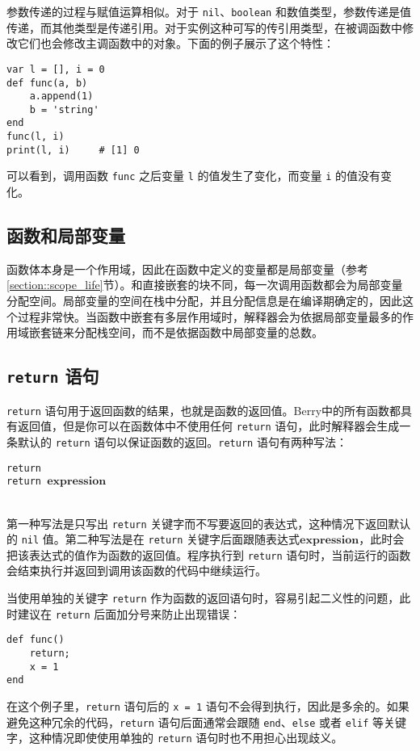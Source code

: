 参数传递的过程与赋值运算相似。对于 \texttt{nil}、\texttt{boolean} 和数值类型，参数传递是值传递，而其他类型是传递引用。对于实例这种可写的传引用类型，在被调函数中修改它们也会修改主调函数中的对象。下面的例子展示了这个特性：
\begin{lstlisting}[language=berry]
var l = [], i = 0
def func(a, b)
    a.append(1)
    b = 'string'
end
func(l, i)
print(l, i)     # [1] 0
\end{lstlisting}
可以看到，调用函数 \texttt{func} 之后变量 \texttt{l} 的值发生了变化，而变量 \texttt{i} 的值没有变化。

\subsection{函数和局部变量}

函数体本身是一个作用域，因此在函数中定义的变量都是局部变量（参考\ref{section::scope_life}节）。和直接嵌套的块不同，每一次调用函数都会为局部变量分配空间。局部变量的空间在栈中分配，并且分配信息是在编译期确定的，因此这个过程非常快。当函数中嵌套有多层作用域时，解释器会为依据局部变量最多的作用域嵌套链来分配栈空间，而不是依据函数中局部变量的总数。

\subsection{\texttt{return} 语句}

\texttt{return} 语句用于返回函数的结果，也就是函数的返回值。Berry中的所有函数都具有返回值，但是你可以在函数体中不使用任何 \texttt{return} 语句，此时解释器会生成一条默认的 \texttt{return} 语句以保证函数的返回。\texttt{return} 语句有两种写法：
\begin{algorithm}
    \texttt{return} \\
    \texttt{return }$\bm{expression}$
\end{algorithm}\vspace{-0.6em}\\
第一种写法是只写出 \texttt{return} 关键字而不写要返回的表达式，这种情况下返回默认的 \texttt{nil} 值。第二种写法是在 \texttt{return} 关键字后面跟随表达式$\bm{expression}$，此时会把该表达式的值作为函数的返回值。程序执行到 \texttt{return} 语句时，当前运行的函数会结束执行并返回到调用该函数的代码中继续运行。

当使用单独的关键字 \texttt{return} 作为函数的返回语句时，容易引起二义性的问题，此时建议在 \texttt{return} 后面加分号来防止出现错误：
\begin{lstlisting}[language=berry, numbers=none]
def func()
    return;
    x = 1
end
\end{lstlisting}
在这个例子里，\texttt{return} 语句后的 \texttt{x = 1} 语句不会得到执行，因此是多余的。如果避免这种冗余的代码，\texttt{return} 语句后面通常会跟随 \texttt{end}、\texttt{else} 或者 \texttt{elif} 等关键字，这种情况即使使用单独的 \texttt{return} 语句时也不用担心出现歧义。

